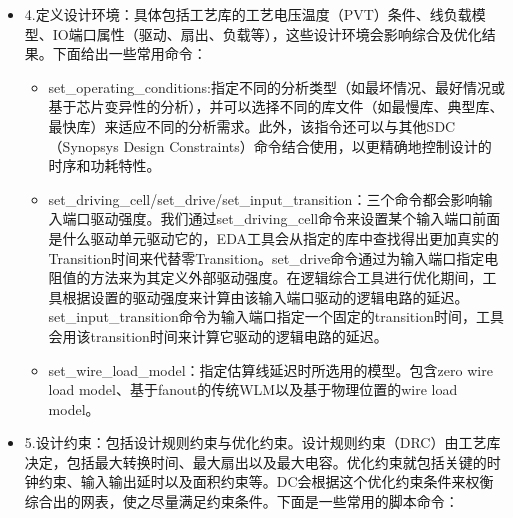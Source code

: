 \begin{itemize}
\item
  4.定义设计环境：具体包括工艺库的工艺电压温度（PVT）条件、线负载模型、IO端口属性（驱动、扇出、负载等），这些设计环境会影响综合及优化结果。下面给出一些常用命令：

  \begin{itemize}
  \item
    set\_operating\_conditions:指定不同的分析类型（如最坏情况、最好情况或基于芯片变异性的分析），并可以选择不同的库文件（如最慢库、典型库、最快库）来适应不同的分析需求。此外，该指令还可以与其他SDC（Synopsys
    Design
    Constraints）命令结合使用，以更精确地控制设计的时序和功耗特性。
  \item
    set\_driving\_cell/set\_drive/set\_input\_transition：三个命令都会影响输入端口驱动强度。我们通过set\_driving\_cell命令来设置某个输入端口前面是什么驱动单元驱动它的，EDA工具会从指定的库中查找得出更加真实的Transition时间来代替零Transition。set\_drive命令通过为输入端口指定电阻值的方法来为其定义外部驱动强度。在逻辑综合工具进行优化期间，工具根据设置的驱动强度来计算由该输入端口驱动的逻辑电路的延迟。set\_input\_transition命令为输入端口指定一个固定的transition时间，工具会用该transition时间来计算它驱动的逻辑电路的延迟。
  \item
    set\_wire\_load\_model：指定估算线延迟时所选用的模型。包含zero wire
    load model、基于fanout的传统WLM以及基于物理位置的wire load
    model。
  \end{itemize}
\item
  5.设计约束：包括设计规则约束与优化约束。设计规则约束（DRC）由工艺库决定，包括最大转换时间、最大扇出以及最大电容。优化约束就包括关键的时钟约束、输入输出延时以及面积约束等。DC会根据这个优化约束条件来权衡综合出的网表，使之尽量满足约束条件。下面是一些常用的脚本命令：
\end{itemize}

